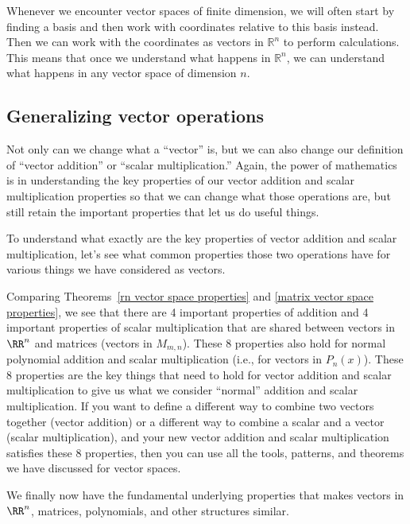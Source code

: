 Whenever we encounter vector spaces of finite dimension, we will often start by finding a basis and then work with coordinates relative to this basis instead. Then we can work with the coordinates as vectors in ${\mathbb{R}}^n$ to perform calculations. This means that once we understand what happens in ${\mathbb{R}}^n$, we can understand what happens in any vector space of dimension $n$. 

\subsection{Generalizing vector operations}

Not only can we change what a ``vector'' is, but we can also change our definition of ``vector addition'' or ``scalar multiplication.''  Again, the power of mathematics is in understanding the key properties of our vector addition and scalar multiplication properties so that we can change what those operations are, but still retain the important properties that let us do useful things.

To understand what exactly are the key properties of vector addition and scalar multiplication, let's see what common properties those two operations have for various things we have considered as vectors.

Comparing Theorems~\ref{rn vector space properties} and \ref{matrix vector space properties}, we see that there are 4 important properties of addition and 4 important properties of scalar multiplication that are shared between vectors in $\RR^n$ and matrices (vectors in $M_{m,n}$).  These 8 properties also hold for normal polynomial addition and scalar multiplication (i.e., for vectors in $P_n(x)$).  These 8 properties are the key things that need to hold for vector addition and scalar multiplication to give us what we consider ``normal'' addition and scalar multiplication.  If you want to define a different way to combine two vectors together (vector addition) or a different way to combine a scalar and a vector (scalar multiplication), and your new vector addition and scalar multiplication satisfies these 8 properties, then you can use all the tools, patterns, and theorems we have discussed for vector spaces.

We finally now have the fundamental underlying properties that makes vectors in $\RR^n$, matrices, polynomials, and other structures similar.


